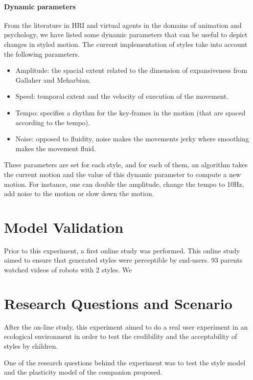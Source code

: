 \documentclass[smallextended]{svjour3}
\begin{document}
\paragraph{Dynamic parameters}
From the literature in HRI and virtual agents in the domains of animation and psychology, we have listed some dynamic parameters that can be useful to depict changes in styled motion.
The current implementation of styles take into account the following parameters. 
\begin{itemize}[noitemsep,nolistsep]
	\item Amplitude: the spacial extent related to the dimension of expansiveness from Gallaher and Meharbian.
	\item Speed: temporal extent and the velocity of execution of the movement.
	\item Tempo: specifies a rhythm for the key-frames in the motion (that are spaced according to the tempo).
	\item Noise: opposed to fluidity, noise makes the movements jerky where smoothing makes the movement fluid.
\end{itemize}
These parameters are set for each style, and for each of them, an algorithm takes the current motion and the value of this dynamic parameter to compute a new motion.
For instance, one can double the amplitude, change the tempo to 10Hz, add noise to the motion or slow down the motion.

\section{Model Validation}
Prior to this experiment, a first online study was performed. 
This online study aimed to ensure that generated styles were perceptible by end-users. 
93 parents watched videos of robots with 2 styles. 
We 


\section{Research Questions and Scenario}\label{sec:research-questions-and-scenario}
After the on-line study, this experiment aimed to do a real user experiment in an ecological environment in order to test the credibility and the acceptability of styles by children. 

One of the research questions behind the experiment was to test the style model and the plasticity model of the companion proposed. 
\end{document}
